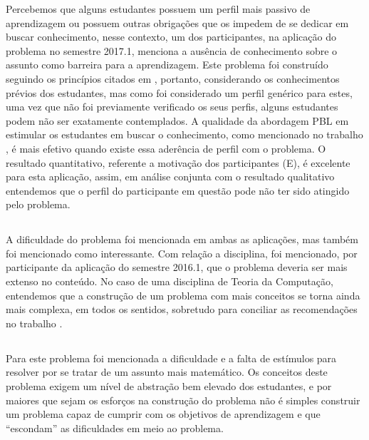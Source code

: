 Percebemos que alguns estudantes possuem um perfil mais passivo
de aprendizagem ou possuem outras obrigações que os impedem
de se dedicar em buscar conhecimento, nesse contexto,
um dos participantes, na aplicação do problema no
semestre 2017.1, menciona a ausência de conhecimento
sobre o assunto como barreira para a aprendizagem.
Este problema foi construído seguindo
os princípios citados em ,
portanto, considerando os conhecimentos prévios
dos estudantes, mas como foi considerado um perfil
genérico para estes, uma vez que não foi
previamente verificado os seus perfis, alguns estudantes
podem não ser exatamente contemplados.
A qualidade da abordagem \ac{PBL} em estimular os estudantes
em buscar o conhecimento, como mencionado no trabalho
, é mais efetivo quando
existe essa aderência de perfil com o problema.
O resultado quantitativo, referente a motivação dos
participantes (E), é excelente para esta
aplicação, assim, em análise conjunta com o
resultado qualitativo entendemos que o perfil
do participante em questão pode não ter sido
atingido pelo problema.

\subsection{\ProblemaE}

A dificuldade do problema foi mencionada em ambas as aplicações, mas
também foi mencionado como interessante.
Com relação a disciplina, foi mencionado, por participante da
aplicação do semestre 2016.1, que o problema deveria ser
mais extenso no conteúdo.
No caso de uma disciplina de Teoria da Computação, entendemos
que a construção de um problema com mais conceitos se
torna ainda mais complexa, em todos os sentidos, sobretudo
para conciliar as recomendações
no trabalho .

\subsection{\ProblemaF}

Para este problema foi mencionada a dificuldade e a falta de estímulos
para resolver por se tratar de um assunto mais matemático.
Os conceitos deste problema exigem um nível de abstração bem elevado
dos estudantes, e por maiores que sejam os esforços na construção
do problema não é simples construir um problema capaz de cumprir com
os objetivos de aprendizagem e que ``escondam'' as dificuldades
em meio ao problema.

